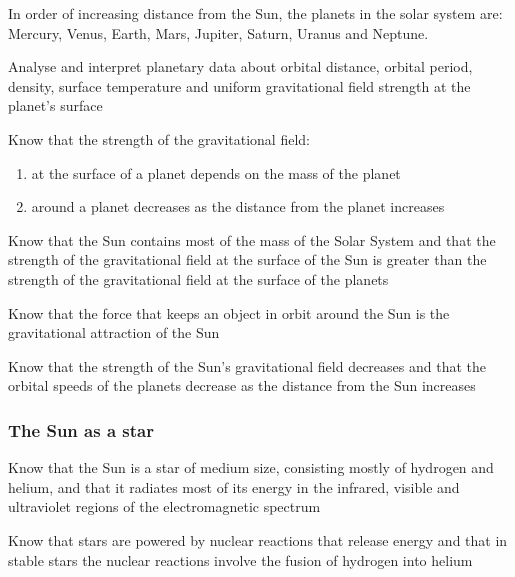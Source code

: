 In order of increasing distance from the Sun, the planets in the solar system are:
Mercury, Venus, Earth, Mars, Jupiter, Saturn, Uranus and Neptune.

\begin{subpoint}
Analyse and interpret planetary data about orbital distance, orbital period, density, surface temperature
and uniform gravitational field strength at the planet’s surface
\end{subpoint}\newpage

\begin{subpoint}
Know that the strength of the gravitational field:

\begin{enumerate}[label=(\alph*)]
\setlength\itemsep{0em}
\item at the surface of a planet depends on the mass of the planet
\item around a planet decreases as the distance from the planet increases
\end{enumerate}
\end{subpoint}

\begin{subpoint}
Know that the Sun contains most of the mass of the Solar System and that the strength of the gravitational
field at the surface of the Sun is greater than the strength of the gravitational field at the surface of the
planets
\end{subpoint}

\begin{subpoint}
Know that the force that keeps an object in orbit around the Sun is the gravitational attraction of the Sun
\end{subpoint}

\begin{subpoint}
Know that the strength of the Sun’s gravitational field decreases and that the orbital speeds of the planets
decrease as the distance from the Sun increases
\end{subpoint}

\subsubsection{The Sun as a star}
\begin{subpoint}
Know that the Sun is a star of medium size, consisting mostly of hydrogen and helium, and that it radiates
most of its energy in the infrared, visible and ultraviolet regions of the electromagnetic spectrum
\end{subpoint}
\begin{subpoint}
Know that stars are powered by nuclear reactions that release energy and that in stable stars the nuclear
reactions involve the fusion of hydrogen into helium
\end{subpoint}

